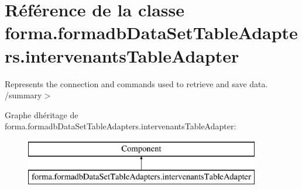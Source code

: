 \hypertarget{classforma_1_1formadb_data_set_table_adapters_1_1intervenants_table_adapter}{}\section{Référence de la classe forma.\+formadb\+Data\+Set\+Table\+Adapters.\+intervenants\+Table\+Adapter}
\label{classforma_1_1formadb_data_set_table_adapters_1_1intervenants_table_adapter}


Represents the connection and commands used to retrieve and save data. /summary$>$  


Graphe d\textquotesingle{}héritage de forma.\+formadb\+Data\+Set\+Table\+Adapters.\+intervenants\+Table\+Adapter\+:\begin{figure}[H]
\begin{center}
\leavevmode
\includegraphics[height=2.000000cm]{classforma_1_1formadb_data_set_table_adapters_1_1intervenants_table_adapter}
\end{center}
\end{figure}
